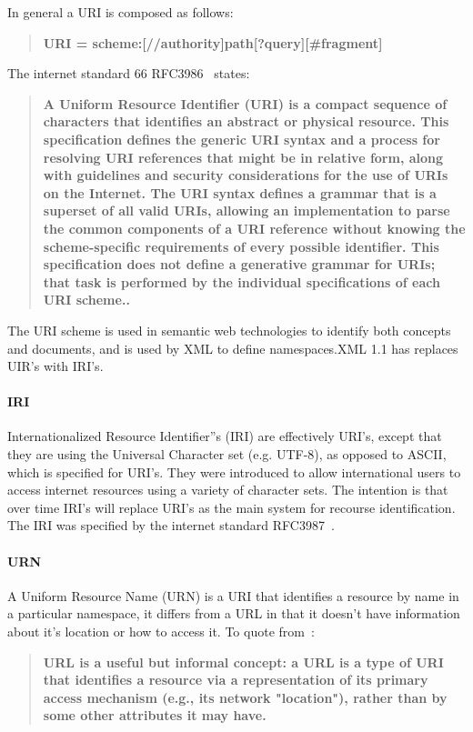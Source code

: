\documentclass{article}
\begin{document}
		In general a URI is composed as follows:
		\begin{quote}\textbf{
				URI = scheme:[//authority]path[?query][\#fragment]
			}
		\end{quote}
		The internet standard 66 RFC3986~\cite{uri1} states:
		\begin{quote}\textbf{A Uniform Resource Identifier (URI) is a compact sequence of characters that identifies an abstract or physical resource. This specification defines the generic URI syntax and a process for resolving URI references that might be in relative form, along with guidelines and security considerations for the use of URIs on the Internet. The URI syntax defines a grammar that is a superset of all valid URIs, allowing an implementation to parse the common components of a URI reference without knowing the scheme-specific requirements of every possible identifier. This specification does not define a generative grammar for URIs; that task is performed by the individual specifications of each URI scheme..}
		\end{quote}
	
	    The URI scheme is used in semantic web technologies to identify both concepts and documents, and is used by XML to define namespaces.XML 1.1 has replaces UIR's with IRI's.
	    
	    \paragraph{IRI}
	    Internationalized Resource Identifier''s (IRI) are effectively URI's, except that they are using the Universal Character set (e.g. UTF-8), as opposed to ASCII, which is specified for URI's. They were introduced to allow international users to access internet resources using a variety of character sets. The intention is that over time IRI's will replace URI's as the main system for recourse identification.  The IRI was specified by the internet standard RFC3987~\cite{iri1}.
	    
	    \paragraph{URN}
	    A Uniform Resource Name (URN) is a URI that identifies a resource by name in a particular namespace, it differs from a URL in that it doesn't have information about it's location or how to access it. To quote from~\cite{urn1}:
	    
	    \begin{quote}\textbf{URL is a useful but informal concept: a URL is a type of URI that identifies a resource via a representation of its primary access mechanism (e.g., its network "location"), rather than by some other attributes it may have.}
	    \end{quote}
	    
\end{document}
